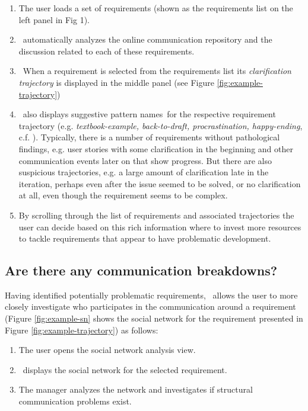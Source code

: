 \begin{enumerate}
\item The user loads a set of requirements (shown as the requirements list on the left panel in Fig 1).
\item \viss\ automatically analyzes the online communication repository and the discussion related to each of these requirements.  
\item \viss\ When a requirement is selected from the requirements list its \emph{clarification trajectory} is displayed in the middle panel (see Figure \ref{fig:example-trajectory})
\item \viss\ also displays suggestive pattern names\ for the respective requirement trajectory (e.g. \emph{textbook-example, back-to-draft, procrastination, happy-ending}, c.f. \cite{Knauss2012f}).
Typically, there is a number of requirements without pathological findings, e.g. user stories with some clarification in the beginning and other communication events later on that show progress. 
But there are also suspicious trajectories, e.g. a large amount of clarification late in the iteration, perhaps even after the issue seemed to be solved, or no clarification at all, even though the requirement seems to be complex.
\item By scrolling through the list of requirements and associated trajectories the user can decide based on this rich information where to invest more resources to tackle requirements that appear to have problematic development.
\end{enumerate}


\subsection{Are there any communication breakdowns?}
Having identified potentially problematic requirements, \viss\  allows the user to more closely investigate who participates in the communication around a requirement (Figure \ref{fig:example-sn} shows the social network for the requirement presented in Figure \ref{fig:example-trajectory}) as follows:
\begin{enumerate}
\item The user opens the social network analysis view.
\item \viss\ displays the social network for the selected requirement.
\item The manager analyzes the network and investigates if structural communication problems exist.
\end{enumerate}

